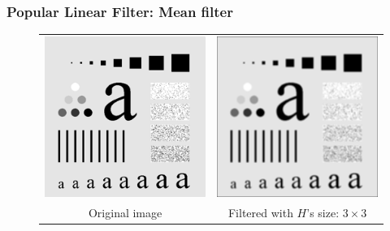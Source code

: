 \documentclass[english,11pt,table,handout]{beamer}
\begin{document}
\frame
{
	\frametitle{Popular Linear Filter: Mean filter}
	\begin{figure}
		\begin{tabular}{cc}
			\includegraphics[scale=0.53]{char.png} &
			\includegraphics[scale=0.53]{char_mean_3_3.png} \\
			Original image & Filtered with $H$'s size: $3 \times 3$
		\end{tabular}
	\end{figure}
}
\end{document}
